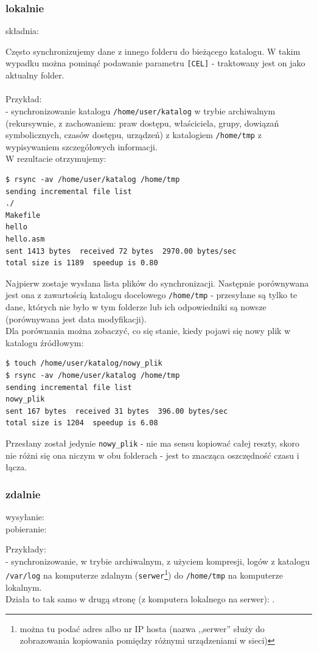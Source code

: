 \subsubsection{lokalnie}
\label{przyklad_lokal}
\begin{center}
składnia: 
\end{center}
Często synchronizujemy dane z innego folderu do bieżącego katalogu. W takim wypadku można pominąć podawanie parametru \verb|[CEL]| - traktowany jest on jako aktualny folder. \\\\
Przykład:\\
 - synchronizowanie katalogu \verb|/home/user/katalog| w trybie archiwalnym (rekursywnie, z zachowaniem: praw dostępu, właściciela, grupy, dowiązań symbolicznych, czasów dostępu, urządzeń) z katalogiem \verb|/home/tmp| z wypisywaniem szczegółowych informacji.\\
W rezultacie otrzymujemy: 
\begin{verbatim}
$ rsync -av /home/user/katalog /home/tmp
sending incremental file list
./
Makefile
hello
hello.asm
sent 1413 bytes  received 72 bytes  2970.00 bytes/sec
total size is 1189  speedup is 0.80
\end{verbatim}
Najpierw zostaje wysłana lista plików do synchronizacji. Następnie porównywana jest ona z zawartością katalogu docelowego \verb|/home/tmp| - przesyłane są tylko te dane, których nie było w tym folderze lub ich odpowiedniki są nowsze (porównywana jest data modyfikacji).\\
Dla porównania można zobaczyć, co się stanie, kiedy pojawi się nowy plik w katalogu źródłowym:
\begin{verbatim}
$ touch /home/user/katalog/nowy_plik
$ rsync -av /home/user/katalog /home/tmp
sending incremental file list
nowy_plik
sent 167 bytes  received 31 bytes  396.00 bytes/sec
total size is 1204  speedup is 6.08
\end{verbatim}
Przesłany został jedynie \verb|nowy_plik| - nie ma sensu kopiować całej reszty, skoro nie różni się ona niczym w obu folderach - jest to znacząca oszczędność czasu i łącza.

\subsubsection{zdalnie}
\label{zdaln}
\begin{center}
 wysyłanie:  \\
 pobieranie: 
\end{center}
Przykłady:\\
 - synchronizowanie, w trybie archiwalnym, z użyciem kompresji, logów z katalogu \verb|/var/log| na komputerze zdalnym (\verb|serwer|\footnote{można tu podać adres albo nr IP hosta (nazwa ,,serwer'' służy do zobrazowania kopiowania pomiędzy różnymi urządzeniami w sieci)}) do \verb|/home/tmp| na komputerze lokalnym.\\
Działa to tak samo w drugą stronę (z komputera lokalnego na serwer): .

